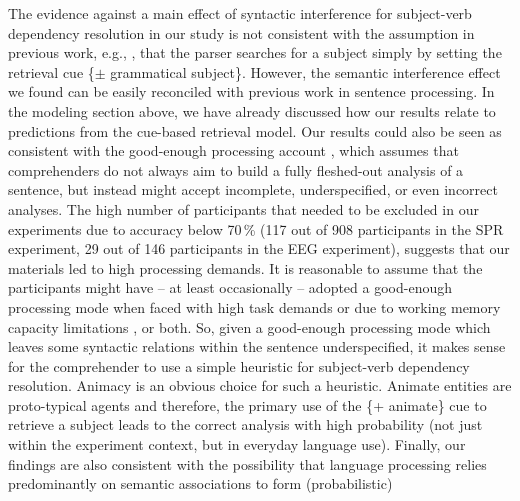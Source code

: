 \documentclass[a4paper, man, floatsintext]{apa7}
\begin{document}

The evidence against a main effect of syntactic interference for subject-verb dependency resolution in our study is not consistent with the assumption in previous work, e.g., \textcite{vandyke07,mertzen}, that the parser searches for a subject simply by setting the retrieval cue \{$\pm$ grammatical subject\}.
  However, the semantic interference effect we found can be easily reconciled with previous work in  sentence processing. In the modeling section above, we have already discussed how our results relate to predictions from the \citet{Lewis2005} cue-based retrieval model.  
 Our results could also be seen as consistent with the good-enough processing account \citep{ferreira2007goodenough}, which assumes that comprehenders do not always aim to build a fully fleshed-out analysis of a sentence, but instead might accept incomplete, underspecified, or even incorrect analyses. The high number of participants that needed to be excluded in our experiments due to accuracy below 70\,\% (117 out of 908 participants in the SPR experiment, 29 out of 146 participants in the EEG experiment), suggests that our materials led to high processing demands. It is reasonable to assume that the participants might have -- at least occasionally -- adopted a good-enough processing mode when faced with high task demands \parencite{swets2008underspecification,LogacevMultiple,LogacevVasishthQJEP2016} or due to working memory capacity limitations \parencite{MalsburgVasishth2013}, or both. So, given a good-enough processing mode which leaves some syntactic relations within the sentence underspecified, it makes sense for the comprehender to use a simple heuristic for subject-verb dependency resolution. Animacy is an obvious choice for such a heuristic. Animate entities are proto-typical agents \citep{dowty1991thematic} and therefore, the primary use of the \{+ animate\} cue to retrieve a subject leads to the correct analysis with high probability (not just within the experiment context, but in everyday language use). Finally, our findings are also consistent with the possibility that language processing relies predominantly on semantic associations to form (probabilistic)
\end{document}
